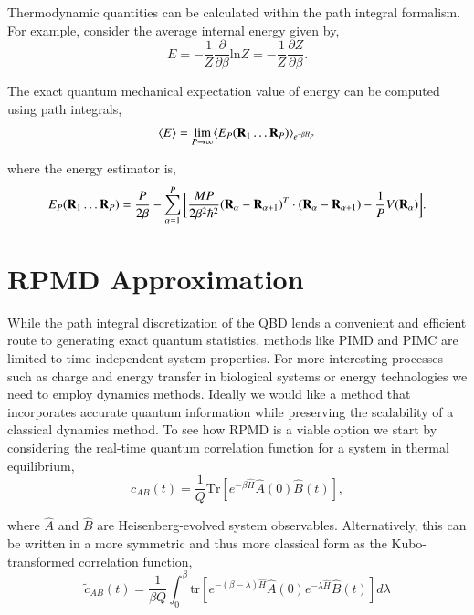 \documentclass[phd,tocprelim]{cornell}
\begin{document}
Thermodynamic quantities can be calculated within the path integral formalism. For example, consider the average internal energy given by,
\begin{equation}
E= -\frac{1}{Z} \frac{\partial}{\partial \beta} \textrm{ln} Z = -\frac{1}{Z}\frac{\partial  Z}{\partial \beta}.
\end{equation}

The exact quantum mechanical expectation value of energy can be computed using path integrals,
\begin{equation}
\langle E \rangle = \lim_{P\to \infty} \langle E_P( {\bf{R}}_1 \dots {\bf{R}}_P) \rangle_{e^{-\beta H_P}} 
\end{equation}

where the energy estimator is, 
\begin{equation}
 E_P( {\bf{R}}_1 \dots {\bf{R}}_P)= \frac{P}{2\beta} - \sum_{\alpha=1}^{P} \bigg[ \frac{MP}{2\beta^2 \hbar^2} 
 ({\bf{R}}_{\alpha}-{\bf{R}}_{\alpha+1})^T\cdot  ({\bf{R}}_{\alpha}-{\bf{R}}_{\alpha+1}) - \frac{1}{P} V({\bf{R}}_{\alpha})\bigg].
\end{equation}

\section{RPMD Approximation}

While the path integral discretization of the QBD lends a convenient and efficient route to generating exact quantum statistics, methods like PIMD and PIMC are limited to time-independent system properties. For more interesting processes such as charge and energy transfer in biological systems or energy technologies we need to employ dynamics methods. Ideally we would like a method that incorporates accurate quantum information while preserving the scalability of a classical dynamics method. To see how RPMD is a viable option we start by considering the real-time quantum correlation function for a system in thermal equilibrium, 
\begin{equation}
c_{AB}(t) = \frac{1}{Q} \textrm{Tr}[ e^{-\beta \hat{H}} \hat{A}(0) \hat{B}(t)],
\end{equation}

where $\hat{A}$ and $\hat{B}$ are Heisenberg-evolved system observables. Alternatively, this can be written in a more symmetric and thus more classical form as the Kubo-transformed correlation function,
\begin{equation}
\tilde{c}_{AB}(t) = \frac{1}{\beta Q} \int_{0}^{\beta} \textrm{tr}[e^{-(\beta -\lambda)\hat{H}}\hat{A}(0)e^{-\lambda \hat{H}} \hat{B}(t)]d\lambda
\end{equation}
\end{document}
